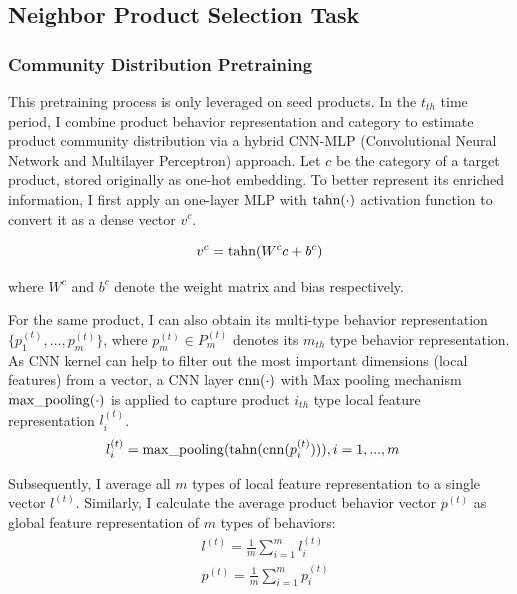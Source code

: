 \subsection{Neighbor Product Selection Task}\label{sc:npst}

\subsubsection{Community Distribution Pretraining} \label{sc:spp}

This pretraining process is only leveraged on seed products. In the $t_{th}$ time period, I combine product behavior representation and category to estimate product community distribution via a hybrid CNN-MLP (Convolutional Neural Network and Multilayer Perceptron) approach. Let $c$ be the category of a target product, stored originally as one-hot embedding. To better represent its enriched information, I first apply an one-layer MLP with $\rm tahn(\cdot)$ activation function to convert it as a dense vector $v^{c}$.

\begin{equation}
v^{c} = {\rm tahn}(W^{c}c+b^{c})
\end{equation}

where $W^{c}$ and $b^c$ denote the weight matrix and bias respectively.

For the same product, I can also obtain its multi-type behavior representation $\{p^{(t)}_{1},...,p^{(t)}_{m}\}$, where $p^{(t)}_{m} \in P^{(t)}_{m}$ denotes its $m_{th}$ type behavior representation. As CNN kernel can help to filter out the most important dimensions (local features) from a vector, a CNN layer ${\rm cnn}(\cdot)$ with Max pooling mechanism ${\rm max\_pooling}(\cdot)$ is applied to capture product $i_{th}$ type local feature representation $l^{(t)}_{i}$.
\begin{equation}
\begin{aligned} 
&l^{(t)}_{i} = {\rm max\_pooling}({\rm tahn}({\rm cnn}(p^{(t)}_{i}))), i= 1,...,m
\end{aligned} 
\end{equation}


Subsequently, I average all $m$ types of local feature representation to a single vector $l^{(t)}$. Similarly, I calculate the average product behavior vector $p^{(t)}$ as global feature representation of $m$ types of behaviors: 
\begin{equation}
\begin{aligned} 
&l^{(t)} = \frac{1}{m}\sum_{i = 1}^{m}l^{(t)}_{i} \\
&p^{(t)} = \frac{1}{m}\sum_{i = 1}^{m}p^{(t)}_{i} 
\end{aligned} 
\end{equation}

